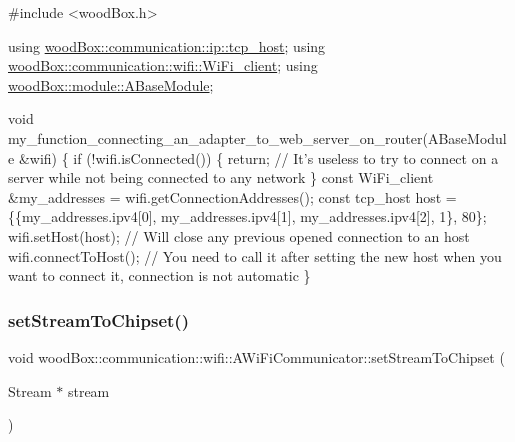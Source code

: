 \begin{DoxyCode}
\textcolor{preprocessor}{#include <woodBox.h>}

\textcolor{keyword}{using} \mbox{\hyperlink{structwood_box_1_1communication_1_1ip_1_1s__host}{woodBox::communication::ip::tcp\_host}};
\textcolor{keyword}{using} \mbox{\hyperlink{structwood_box_1_1communication_1_1wifi_1_1s__wifi__client}{woodBox::communication::wifi::WiFi\_client}};
\textcolor{keyword}{using} \mbox{\hyperlink{classwood_box_1_1module_1_1_a_base_module}{woodBox::module::ABaseModule}};

\textcolor{keywordtype}{void} my\_function\_connecting\_an\_adapter\_to\_web\_server\_on\_router(ABaseModule &wifi) \{
  \textcolor{keywordflow}{if} (!wifi.isConnected()) \{
    \textcolor{keywordflow}{return}; \textcolor{comment}{// It's useless to try to connect on a server while not being connected to any network}
  \}
  \textcolor{keyword}{const} WiFi\_client &my\_addresses = wifi.getConnectionAddresses();
  \textcolor{keyword}{const} tcp\_host host = \{\{my\_addresses.ipv4[0], my\_addresses.ipv4[1], my\_addresses.ipv4[2], 1\}, 80\};
  wifi.setHost(host); \textcolor{comment}{// Will close any previous opened connection to an host}
  wifi.connectToHost(); \textcolor{comment}{// You need to call it after setting the new host when you want to connect it,
       connection is not automatic}
\}
\end{DoxyCode}
 \mbox{\label{classwood_box_1_1communication_1_1wifi_1_1_a_wi_fi_communicator_a526d2c9ece9000889fd40d9ab98acbdf}} 
\subsubsection{\texorpdfstring{set\+Stream\+To\+Chipset()}{setStreamToChipset()}}
{\footnotesize\ttfamily void wood\+Box\+::communication\+::wifi\+::\+A\+Wi\+Fi\+Communicator\+::set\+Stream\+To\+Chipset (\begin{DoxyParamCaption}\item[{Stream $\ast$}]{stream }\end{DoxyParamCaption})}

